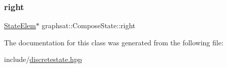 \subsubsection{\texorpdfstring{right}{right}}
{\footnotesize\ttfamily \mbox{\hyperlink{classgraphsat_1_1_state_elem}{State\+Elem}}$\ast$ graphsat\+::\+Compose\+State\+::right\hspace{0.3cm}{\ttfamily [private]}}



The documentation for this class was generated from the following file\+:\begin{DoxyCompactItemize}
\item 
include/\mbox{\hyperlink{discretestate_8hpp}{discretestate.\+hpp}}\end{DoxyCompactItemize}
